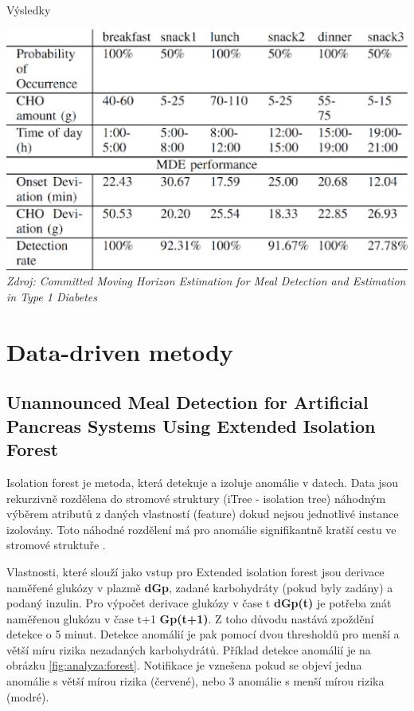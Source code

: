 \begin{table}[H]
\caption{Výsledky}
\label{tab:analyza:horizon5}
\centering
\includegraphics[width=1\textwidth]{img/analyzaCHO/horizon5.png}\\
\textit{Zdroj: Committed Moving Horizon Estimation for Meal Detection and Estimation in Type 1 Diabetes \citep{analyzaCHO.MovingHorizon}}
\end{table}


\section{Data-driven metody}
\subsection{Unannounced Meal Detection for Artificial Pancreas Systems Using Extended Isolation Forest}
\label{ch:analyzaCHO:forest}

Isolation forest je metoda, která detekuje a izoluje anomálie v datech. Data jsou rekurzivně rozdělena do stromové struktury (iTree - isolation tree) náhodným výběrem atributů z daných vlastností (feature) dokud nejsou jednotlivé instance izolovány. Toto náhodné rozdělení má pro anomálie signifikantně kratší cestu ve stromové struktuře \citep{analyzaCHO.IsolationForest}.

Vlastnosti, které slouží jako vstup pro Extended isolation forest \citep{analyzaCHO.ExtendedIsolationForest} jsou derivace naměřené glukózy v plazmě \textbf{dGp}, zadané karbohydráty (pokud byly zadány) a podaný inzulin. Pro výpočet derivace glukózy v čase t \textbf{dGp(t)} je potřeba znát naměřenou glukózu v čase t+1 \textbf{Gp(t+1)}. Z toho důvodu nastává zpoždění detekce o 5 minut. Detekce anomálií je pak pomocí dvou thresholdů pro menší a větší míru rizika nezadaných karbohydrátů.
Příklad detekce anomálií je na obrázku \ref{fig:analyza:forest}. Notifikace je vznešena pokud se objeví jedna anomálie s větší mírou rizika (červené), nebo 3 anomálie s menší mírou rizika (modré).

